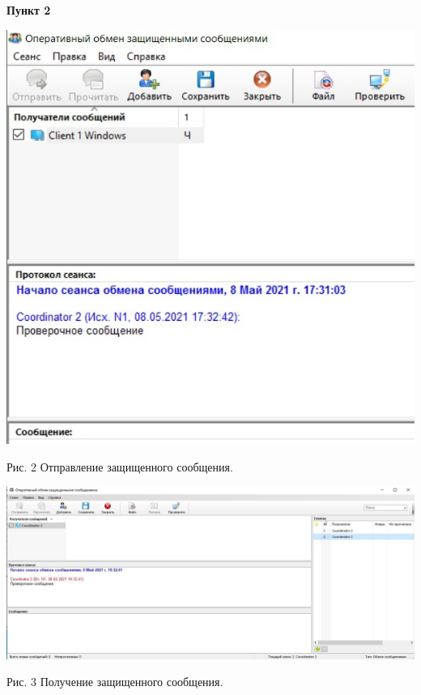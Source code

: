 \documentclass[a4paper,14pt]{extarticle}
\begin{document}
    \textbf{Пункт 2}
    \vspace{-3ex}
    \begin{center}
        \singlespacing
 
        \includegraphics[scale=0.6]{pics/2_1.jpg}

        Рис. 2 Отправление защищенного сообщения.

        \includegraphics[scale=0.35]{pics/2_2.jpg}

        Рис. 3 Получение защищенного сообщения.
    \end{center}
\end{document}
